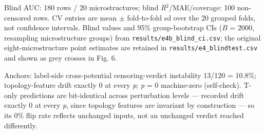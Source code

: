 \documentclass[11pt]{article}
\begin{document}
\begin{table}[p!]
\vspace{0.5em}
{\footnotesize Blind AUC: 180 rows / 20 microstructures; blind \textit{R}$^{2}$/MAE/coverage: 100 non-censored rows. CV entries are mean $\pm$ fold-to-fold sd over the 20 grouped folds, not confidence intervals. Blind values and 95\% group-bootstrap CIs ($B$ = 2000, resampling microstructure groups) from \texttt{results/e4b\_blind\_ci.csv}; the original eight-microstructure point estimates are retained in \texttt{results/e4\_blindtest.csv} and shown as grey crosses in Fig. 6.\par}
\end{table}

\begin{table}[p!]
\centering
\caption{\textbf{Table 3 --- Error propagation (E5, original eight-group audit set; medians over 8 MC trials).}}
\vspace{0.4em}
\footnotesize
\setlength{\tabcolsep}{4pt}

\vspace{0.5em}
{\footnotesize Anchors: label-side cross-potential censoring-verdict instability 13/120 = 10.8\%; topology-feature drift exactly 0 at every \textit{p}; \textit{p} = 0 machine-zero (self-check). T-only predictions are bit-identical across perturbation levels --- recorded drift exactly 0 at every \textit{p}, since topology features are invariant by construction --- so its 0\% flip rate reflects unchanged inputs, not an unchanged verdict reached differently.\par}
\end{table}
\end{document}

